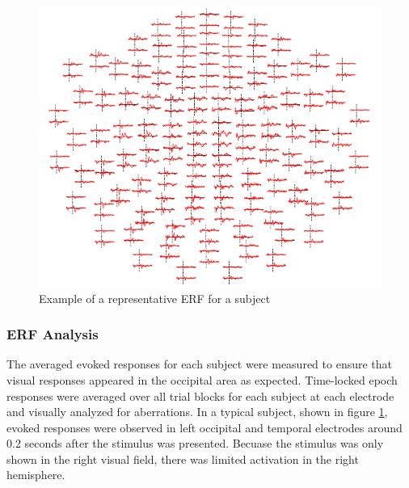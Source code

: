 \documentclass[../main.tex]{subfiles}
\begin{document}
\begin{figure}
    \centering
    \includegraphics[scale=0.8]{figures/methods/good_topomap.PNG}
    \caption{Example of a representative ERF for a subject}
    \label{good_topomap}
\end{figure}

\subsubsection{ERF Analysis}
The averaged evoked responses for each subject were measured to ensure that visual responses
appeared in the occipital area as expected. Time-locked epoch responses were averaged over all
trial blocks for each subject at each electrode and visually analyzed for aberrations. In a typical subject, shown in figure \ref{good_topomap}, evoked responses were observed in left occipital and temporal electrodes around 0.2 seconds after the stimulus was presented. Becuase the stimulus was only shown in the right visual field, there was limited activation in the right hemisphere.
\end{document}
